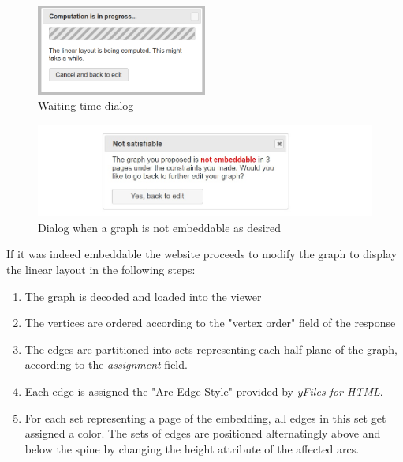 {\begin{figure}
\begin{center}
\includegraphics[width=0.5\textwidth]{figures/figSecond/waittime.png}
\caption{Waiting time dialog}
\label{Waiting}
\end{center}
\end{figure}
\begin{figure}
\begin{center}
\includegraphics[width=\textwidth]{figures/figSecond/NotEmbeddable.jpg}
\caption{Dialog when a graph is not embeddable as desired}
\label{NoEmb}
\end{center}
\end{figure}
\noindent If it was indeed embeddable the website proceeds to modify the graph to display the linear layout in the following steps:
\begin{enumerate}
\item The graph is decoded and loaded into the viewer
\item The vertices are ordered according to the "vertex order" field of the response
\item The edges are partitioned into sets representing each half plane of the graph, according to the \textit{assignment} field.
\item Each edge is assigned the "Arc Edge Style" provided by \textit{yFiles for HTML}. 
\item For each set representing a page of the embedding, all edges in this set get assigned a color. The sets of edges are positioned alternatingly above and below the spine by changing the height attribute of the affected arcs.\\
\end{enumerate}
}
